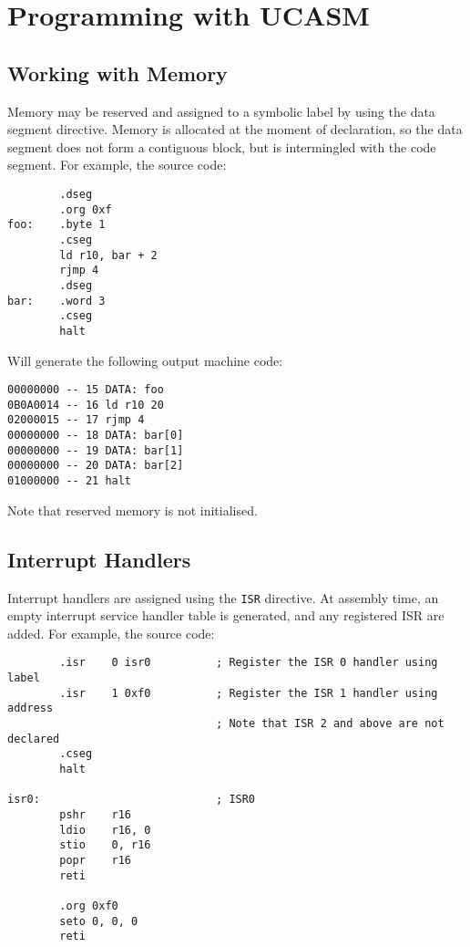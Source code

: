 \documentclass[12pt,twoside]{report}
\begin{document}
\chapter{Programming with UCASM}

\section{Working with Memory}

Memory may be reserved and assigned to a symbolic label by using the
data segment directive. Memory is allocated at the moment of
declaration, so the data segment does not form a contiguous block, but
is intermingled with the code segment. For example, the source code:

\begin{verbatim}
        .dseg
        .org 0xf
foo:    .byte 1
        .cseg
        ld r10, bar + 2
        rjmp 4
        .dseg
bar:    .word 3
        .cseg
        halt
\end{verbatim}

Will generate the following output machine code:

\begin{verbatim}
00000000 -- 15 DATA: foo
0B0A0014 -- 16 ld r10 20
02000015 -- 17 rjmp 4
00000000 -- 18 DATA: bar[0]
00000000 -- 19 DATA: bar[1]
00000000 -- 20 DATA: bar[2]
01000000 -- 21 halt
\end{verbatim}

Note that reserved memory is not initialised.

\section{Interrupt Handlers}

Interrupt handlers are assigned using the \texttt{ISR} directive. At
assembly time, an empty interrupt service handler table is generated,
and any registered ISR are added. For example, the source code:

\begin{verbatim}
        .isr    0 isr0          ; Register the ISR 0 handler using label
        .isr    1 0xf0          ; Register the ISR 1 handler using address
                                ; Note that ISR 2 and above are not declared
        .cseg
        halt

isr0:                           ; ISR0
        pshr    r16
        ldio    r16, 0
        stio    0, r16
        popr    r16
        reti

        .org 0xf0
        seto 0, 0, 0
        reti
\end{verbatim}
\end{document}

